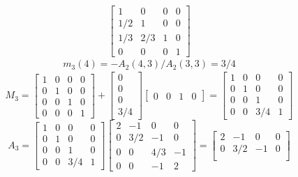 \begin{itemize}
\[\begin{bmatrix}
   			 1 & 0 & 0 & 0 \\ 
    		 1/2 & 1 & 0 & 0 \\
    		 1/3 & 2/3 & 1 & 0 \\
    		 0 & 0 & 0 & 1  
  			\end{bmatrix}
  			\]
   			\begin {equation*} \begin {split}  	
				m_{3}(4) = -A_{2}(4,3)/A_{2}(3,3) = 3/4  
  			\end {split} \end {equation*} 
  			\[ M_{3} = 
  			\begin{bmatrix}
   			 1 & 0 & 0 & 0 \\ 
    		 0 & 1 & 0 & 0 \\
    		 0 & 0 & 1 & 0 \\
    		 0 & 0 & 0 & 1  
  			\end{bmatrix}
  			+
  			\begin{bmatrix}
   			 0 \\ 
    		 0 \\
    		 0 \\
    		 3/4  
  			\end{bmatrix}
  			\begin{bmatrix}
   			 0 & 0 & 1 & 0 
  			\end{bmatrix}
  			=
  			\begin{bmatrix}
   			 1 & 0 & 0 & 0 \\ 
    		 0 & 1 & 0 & 0 \\
    		 0 & 0 & 1 & 0 \\
    		 0 & 0 & 3/4 & 1  
  			\end{bmatrix}
  			\]	
  			\[ A_{3} = 
  			\begin{bmatrix}
   			 1 & 0 & 0 & 0 \\ 
    		 0 & 1 & 0 & 0 \\
    		 0 & 0 & 1 & 0 \\
    		 0 & 0 & 3/4 & 1  
  			\end{bmatrix}
			\begin{bmatrix}
    		2 & -1 & 0 & 0 \\
    		0 & 3/2 & -1 & 0 \\
    		0 & 0 & 4/3 & -1 \\
    		0 & 0 & -1 & 2  
  			\end{bmatrix}
  			=
  			\begin{bmatrix}
    		2 & -1 & 0 & 0 \\
    		0 & 3/2 & -1 & 0 \\

\end{bmatrix}\]
\end{itemize}

